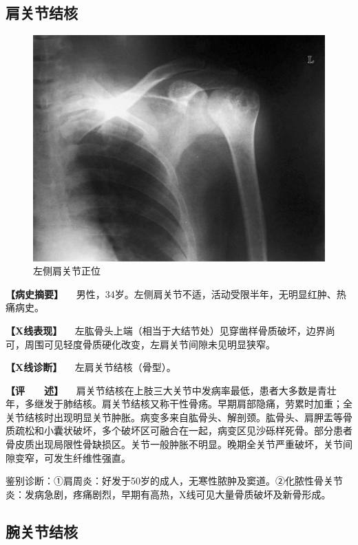 \subsection{肩关节结核}

\begin{figure}[!htbp]
 \centering
 \includegraphics{./images/Image00083.jpg}
 \captionsetup{justification=centering}
 \caption{左侧肩关节正位}
 \label{fig2-6-8}
  \end{figure} 

\textbf{【病史摘要】}
　男性，34岁。左侧肩关节不适，活动受限半年，无明显红肿、热痛病史。

\textbf{【X线表现】}
　左肱骨头上端（相当于大结节处）见穿凿样骨质破坏，边界尚可，周围可见轻度骨质硬化改变，左肩关节间隙未见明显狭窄。

\textbf{【X线诊断】} 　左肩关节结核（骨型）。

\textbf{【评　　述】}
　肩关节结核在上肢三大关节中发病率最低，患者大多数是青壮年，多继发于肺结核。肩关节结核又称干性骨疡。早期肩部隐痛，劳累时加重；全关节结核时出现明显关节肿胀。病变多来自肱骨头、解剖颈。肱骨头、肩胛盂等骨质疏松和小囊状破坏，多个破坏区可融合在一起，病变区见沙砾样死骨。部分患者骨皮质出现局限性骨缺损区。关节一般肿胀不明显。晚期全关节严重破坏，关节间隙变窄，可发生纤维性强直。

鉴别诊断：①肩周炎：好发于50岁的成人，无寒性脓肿及窦道。②化脓性骨关节炎：发病急剧，疼痛剧烈，早期有高热，X线可见大量骨质破坏及新骨形成。

\subsection{腕关节结核}

